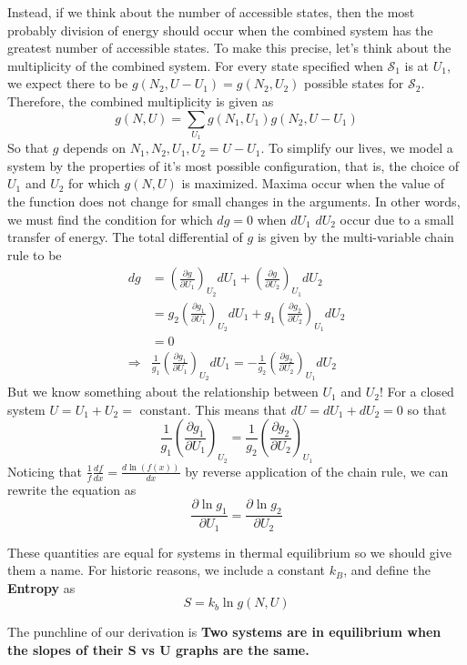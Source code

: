 \documentclass{article}
\begin{document}
Instead, if we think about the number of accessible states, then the most
probably division of energy should occur when the combined system has the
greatest number of accessible states. To make this precise, let's think about
the multiplicity of the combined system. For every state specified when
$\mathcal{S}_1$ is at $U_1$, we expect there to be $g(N_2, U-U_1)=g(N_2,U_2)$
possible states for $\mathcal{S}_2$. Therefore, the combined multiplicity is
given as
\begin{equation}
  g(N,U) = \sum_{U_1}g(N_1, U_1)g(N_2, U-U_1)
\end{equation}
So that $g$ depends on $N_1, N_2,U_1, U_2 = U-U_1$. To simplify our lives, we    
model a system by the properties of it's most possible configuration, that is,
the choice of $U_1$ and $U_2$ for which $g(N,U)$ is maximized. Maxima occur when
the value of the function does not change for small changes in the arguments. In
other words, we must find the condition for which $dg=0$ when $dU_1$ $dU_2$
occur due to a small transfer of energy. The total differential of $g$ is given
by the multi-variable chain rule to be
\begin{align}
  dg &= \left( \frac{\partial g}{\partial U_1} \right)_{U_2}dU_1+\left( \frac{\partial g}{\partial U_2} \right)_{U_1}dU_2 \\
     &=  g_2\left( \frac{\partial g_1}{\partial U_1} \right)_{U_2}dU_1+g_1\left( \frac{\partial g_2}{\partial U_2} \right)_{U_1}dU_2\\
     &= 0\\
 \Rightarrow& \frac{1}{g_1}\left( \frac{\partial g_1}{\partial U_1} \right)_{U_2}dU_1  = -\frac{1}{g_2}\left( \frac{\partial g_2}{\partial U_2} \right)_{U_1}dU_2
\end{align}
But we know something about the relationship between $U_1$ and $U_2$! For a
closed system $U=U_1+U_2=\textrm{ constant}$. This means that $dU=dU_1+dU_2=0$
so that
\begin{equation}
  \frac{1}{g_1}\left( \frac{\partial g_1}{\partial U_1} \right)_{U_2}  = \frac{1}{g_2}\left( \frac{\partial g_2}{\partial U_2} \right)_{U_1}
\end{equation}
Noticing that $\frac{1}{f}\frac{df}{dx}=\frac{d \ln(f(x))}{d x}$ by reverse
application of the chain rule, we can rewrite the equation as
\begin{equation}
  \frac{\partial \ln g_1}{\partial U_1} = \frac{\partial \ln g_2}{\partial U_2}
\end{equation}

These quantities are equal for systems in thermal equilibrium so we should give
them a name. For historic reasons, we include a constant $k_B$, and define the
\textbf{Entropy} as
\begin{equation}
  S = k_b\ln g(N,U)
\end{equation}

The punchline of our derivation is \textbf{Two systems are in equilibrium when
 the slopes of their S vs U graphs are the same.}
\end{document}
